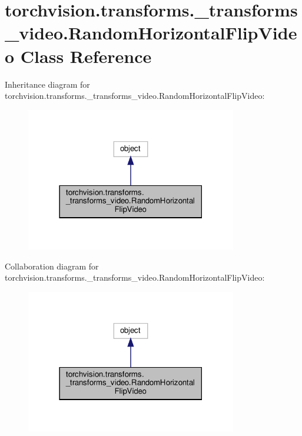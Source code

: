 \hypertarget{classtorchvision_1_1transforms_1_1__transforms__video_1_1RandomHorizontalFlipVideo}{}\section{torchvision.\+transforms.\+\_\+transforms\+\_\+video.\+Random\+Horizontal\+Flip\+Video Class Reference}
\label{classtorchvision_1_1transforms_1_1__transforms__video_1_1RandomHorizontalFlipVideo}


Inheritance diagram for torchvision.\+transforms.\+\_\+transforms\+\_\+video.\+Random\+Horizontal\+Flip\+Video\+:
\nopagebreak
\begin{figure}[H]
\begin{center}
\leavevmode
\includegraphics[width=261pt]{classtorchvision_1_1transforms_1_1__transforms__video_1_1RandomHorizontalFlipVideo__inherit__graph}
\end{center}
\end{figure}


Collaboration diagram for torchvision.\+transforms.\+\_\+transforms\+\_\+video.\+Random\+Horizontal\+Flip\+Video\+:
\nopagebreak
\begin{figure}[H]
\begin{center}
\leavevmode
\includegraphics[width=261pt]{classtorchvision_1_1transforms_1_1__transforms__video_1_1RandomHorizontalFlipVideo__coll__graph}
\end{center}
\end{figure}
